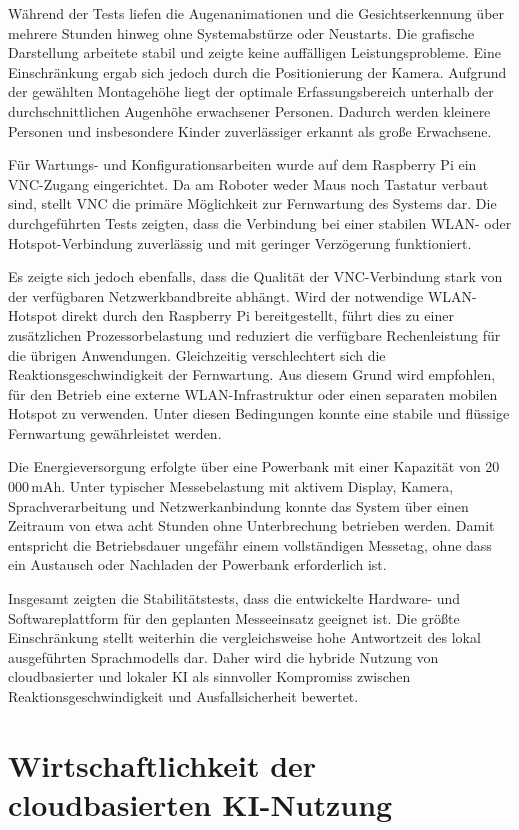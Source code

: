 Während der Tests liefen die Augenanimationen und die Gesichtserkennung über mehrere Stunden hinweg ohne Systemabstürze oder Neustarts. Die grafische Darstellung arbeitete stabil und zeigte keine auffälligen Leistungsprobleme. Eine Einschränkung ergab sich jedoch durch die Positionierung der Kamera. Aufgrund der gewählten Montagehöhe liegt der optimale Erfassungsbereich unterhalb der durchschnittlichen Augenhöhe erwachsener Personen. Dadurch werden kleinere Personen und insbesondere Kinder zuverlässiger erkannt als große Erwachsene.

Für Wartungs- und Konfigurationsarbeiten wurde auf dem Raspberry Pi ein VNC-Zugang eingerichtet. Da am Roboter weder Maus noch Tastatur verbaut sind, stellt VNC die primäre Möglichkeit zur Fernwartung des Systems dar. Die durchgeführten Tests zeigten, dass die Verbindung bei einer stabilen WLAN- oder Hotspot-Verbindung zuverlässig und mit geringer Verzögerung funktioniert.

Es zeigte sich jedoch ebenfalls, dass die Qualität der VNC-Verbindung stark von der verfügbaren Netzwerkbandbreite abhängt. Wird der notwendige WLAN-Hotspot direkt durch den Raspberry Pi bereitgestellt, führt dies zu einer zusätzlichen Prozessorbelastung und reduziert die verfügbare Rechenleistung für die übrigen Anwendungen. Gleichzeitig verschlechtert sich die Reaktionsgeschwindigkeit der Fernwartung. Aus diesem Grund wird empfohlen, für den Betrieb eine externe WLAN-Infrastruktur oder einen separaten mobilen Hotspot zu verwenden. Unter diesen Bedingungen konnte eine stabile und flüssige Fernwartung gewährleistet werden.

Die Energieversorgung erfolgte über eine Powerbank mit einer Kapazität von 20\,000\,mAh. Unter typischer Messebelastung mit aktivem Display, Kamera, Sprachverarbeitung und Netzwerkanbindung konnte das System über einen Zeitraum von etwa acht Stunden ohne Unterbrechung betrieben werden. Damit entspricht die Betriebsdauer ungefähr einem vollständigen Messetag, ohne dass ein Austausch oder Nachladen der Powerbank erforderlich ist.

Insgesamt zeigten die Stabilitätstests, dass die entwickelte Hardware- und Softwareplattform für den geplanten Messeeinsatz geeignet ist. Die größte Einschränkung stellt weiterhin die vergleichsweise hohe Antwortzeit des lokal ausgeführten Sprachmodells dar. Daher wird die hybride Nutzung von cloudbasierter und lokaler KI als sinnvoller Kompromiss zwischen Reaktionsgeschwindigkeit und Ausfallsicherheit bewertet.

\section{Wirtschaftlichkeit der cloudbasierten KI-Nutzung}

